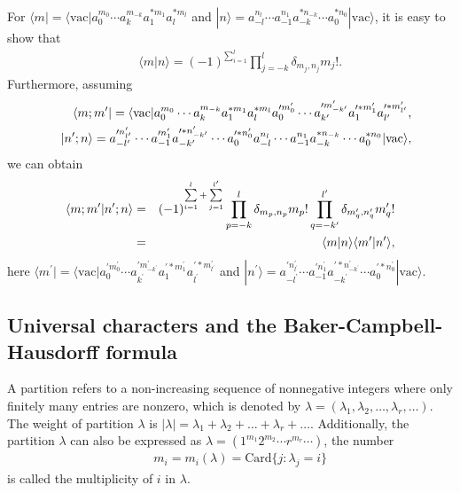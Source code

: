 \documentclass[10pt,a4paper]{amsart}
\numberwithin{equation}{section}
\begin{document}
For $\langle m|=\langle\text{vac}|a^{m_{0}}_{0}\cdots a^{m_{-k}}_{k}a^{\ast m_{1}}_{1}a^{\ast m_{l}}_{l}$ and $|n\rangle=a^{n_{l}}_{-l}\cdots a^{n_{1}}_{-1}a^{\ast n_{-k}}_{-k}\cdots a^{\ast n_{0}}_{0}|\text{vac}\rangle$, it is easy to show that
\begin{eqnarray}
&&\langle m|n\rangle=(-1)^{\sum\limits^{l}_{i=1}}\prod\limits^{l}_{j=-k}\delta_{m_{j},n_{j}}m_{j}!.
\end{eqnarray}
Furthermore, assuming
\begin{eqnarray}
&&\langle m;m^{\prime}|=\langle\text{vac}|a^{m_{0}}_{0}\cdots a^{m_{-k}}_{k}a^{\ast m_{1}}_{1}a^{\ast m_{l}}_{l}a^{\prime m^{\prime}_{0}}_{0}\cdots a^{\prime m^{\prime}_{-k^{\prime}}}_{k^{\prime}}a^{\prime\ast m^{\prime}_{1}}_{1}a^{\prime\ast m^{\prime}_{l^{\prime}}}_{l^{\prime}},\notag\\
&&|n^{\prime};n\rangle=a^{\prime n^{\prime}_{l^{\prime}}}_{-l^{\prime}}\cdots a^{\prime n^{\prime}_{1}}_{-1}a^{\prime \ast n^{\prime}_{-k^{\prime}}}_{-k^{\prime}}\cdots a^{\prime \ast n^{\prime
}_{0}}_{0}a^{n_{l}}_{-l}\cdots a^{n_{1}}_{-1}a^{\ast n_{-k}}_{-k}\cdots a^{\ast n_{0}}_{0}|\text{vac}\rangle,
\end{eqnarray}
 we can obtain
\begin{eqnarray}\label{double_product}
\langle m;m^{\prime}|n^{\prime};n\rangle&=&(-1)^{\sum\limits^{l}_{i=1}+\sum\limits^{l^{\prime}}_{j=1}}
\prod\limits^{l}_{p=-k}\delta_{m_{p},n_{p}}m_{p}!\prod\limits^{l^{\prime}}_{q=-k^{\prime}}
\delta_{m^{\prime}_{q},n^{\prime}_{q}}m^{\prime}_{q}!\notag\\
&=&\langle m|n\rangle\langle m^{\prime}|n^{\prime}\rangle,
\end{eqnarray}
here $\langle m^{\prime}|=\langle\text{vac}|a^{\prime m^{\prime}_{0}}_{0}\cdots a^{\prime m^{\prime}_{-k^{\prime}}}_{k^{\prime}}a^{\prime\ast m^{\prime}_{1}}_{1}a^{\prime\ast m^{\prime}_{l^{\prime}}}_{l^{\prime}}$ and $|n^{\prime}\rangle=a^{\prime n^{\prime}_{l^{\prime}}}_{-l^{\prime}}\cdots a^{\prime n^{\prime}_{1}}_{-1}a^{\prime \ast n^{\prime}_{-k^{\prime}}}_{-k^{\prime}}\cdots a^{\prime \ast n^{\prime}_{0}}_{0}|\text{vac}\rangle$.



\subsection{Universal characters and the Baker-Campbell-Hausdorff  formula}
A partition refers to a non-increasing sequence of nonnegative integers where only finitely many entries are nonzero, which is denoted by $\lambda=(\lambda_1, \lambda_2, \ldots, \lambda_r, \ldots)$. The weight of partition $\lambda$ is   $|\lambda|=\lambda_1+\lambda_2+\ldots+\lambda_r+\ldots$. Additionally, the partition $\lambda$ can also be expressed  as $\lambda=(1^{m_{1}}2^{m_{2}}\cdots r^{m_{r}}\cdots)$, the number
\begin{eqnarray}
&&m_{i}=m_{i}(\lambda)=\text{Card}\{j:\lambda_{j}=i\}
\end{eqnarray}
is called the multiplicity of $i$ in $\lambda$.
\end{document}

